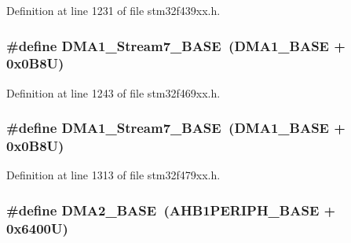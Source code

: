 Definition at line 1231 of file stm32f439xx.\+h.

\subsubsection[{\texorpdfstring{D\+M\+A1\+\_\+\+Stream7\+\_\+\+B\+A\+SE}{DMA1_Stream7_BASE}}]{\setlength{\rightskip}{0pt plus 5cm}\#define D\+M\+A1\+\_\+\+Stream7\+\_\+\+B\+A\+SE~({\bf D\+M\+A1\+\_\+\+B\+A\+SE} + 0x0\+B8\+U)}\hypertarget{group___peripheral__memory__map_ga82186dd6d3f60995d428b34c041919d7}{}\label{group___peripheral__memory__map_ga82186dd6d3f60995d428b34c041919d7}


Definition at line 1243 of file stm32f469xx.\+h.

\subsubsection[{\texorpdfstring{D\+M\+A1\+\_\+\+Stream7\+\_\+\+B\+A\+SE}{DMA1_Stream7_BASE}}]{\setlength{\rightskip}{0pt plus 5cm}\#define D\+M\+A1\+\_\+\+Stream7\+\_\+\+B\+A\+SE~({\bf D\+M\+A1\+\_\+\+B\+A\+SE} + 0x0\+B8\+U)}\hypertarget{group___peripheral__memory__map_ga82186dd6d3f60995d428b34c041919d7}{}\label{group___peripheral__memory__map_ga82186dd6d3f60995d428b34c041919d7}


Definition at line 1313 of file stm32f479xx.\+h.

\subsubsection[{\texorpdfstring{D\+M\+A2\+\_\+\+B\+A\+SE}{DMA2_BASE}}]{\setlength{\rightskip}{0pt plus 5cm}\#define D\+M\+A2\+\_\+\+B\+A\+SE~({\bf A\+H\+B1\+P\+E\+R\+I\+P\+H\+\_\+\+B\+A\+SE} + 0x6400\+U)}\hypertarget{group___peripheral__memory__map_gab72a9ae145053ee13d1d491fb5c1df64}{}\label{group___peripheral__memory__map_gab72a9ae145053ee13d1d491fb5c1df64}


